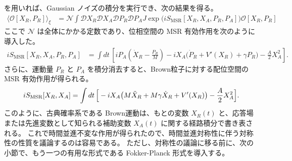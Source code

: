 を用いれば、Gaussian ノイズの積分を実行でき、次の結果を得る。
\begin{equation}
 \begin{split}
  \langle \mathcal{O}[X_R,P_R] \rangle_\xi
  &= \mathcal N \int \mathcal{D} X_R \mathcal{D} X_A \mathcal{D} P_R  \mathcal{D} P_A J
  \exp \Big( iS_{\mathrm{MSR}} [X_R,X_A,P_R,P_A] \Big)
  \mathcal{O}[X_R,P_R]
 \end{split}
\end{equation}
ここで $\mathcal N$ は全体にかかる定数であり、位相空間の MSR 有効作用を次のように導入した。
\begin{align}
 iS_{\mathrm{MSR}}[X_R,X_A,P_R,P_A] 
 &=\int dt\, \left[  i P_A \left( \dot{X}_R - \frac{P_R}{M} \right) 
 - i X_A \big(\dot P_R+ V'(X_R) + \gamma P_R  \big)
 - \frac{A}{2}X_A^2\right].
 \label{eq:MSR1}
 \end{align}
さらに、運動量 $P_R$ と $P_A$ を積分消去すると、Brown粒子に対する配位空間の MSR 有効作用が得られる。
\begin{align}
 iS_{\rm MSR}[X_{R},X_{A}]=\int dt\, 
 \Big[  -i X_A \big( M\ddot{X}_R + M \gamma\dot{X}_{R} + V'(X_{R})
  \big)  - \frac{A}{2}X_A^2 \Big]. \label{eq:MSR2}
\end{align}
このように、古典確率系である Brown運動は、もとの変数 $X_R(t)$ と、応答場または先進変数として知られる補助変数 $X_A(t)$ に関する経路積分で書き表される。
これで時間並進不変な作用が得られたので、時間並進対称性に伴う対称性の性質を議論するのは容易である。
ただし、対称性の議論に移る前に、次の小節で、もう一つの有用な形式である Fokker-Planck 形式を導入する。



